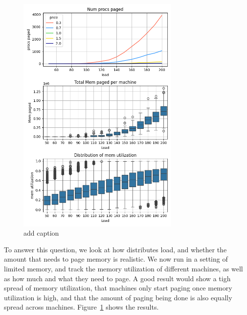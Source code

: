 \begin{figure}[t!]
    \centering
      \includegraphics[width=8cm]{img/memory_graphs.png}
      \caption{ add caption }
    \label{fig:memory-graphs}
\end{figure}

To answer this question, we look at how \sys{} distributes load, and whether the
amount that \sys{} needs to page memory is realistic. We now run \sys{} in a
setting of limited memory, and track the memory utilization of different
machines, as well as how much and what they need to page. A good result would
show a tigh spread of memory utilization, that machines only start paging once
memory utilization is high, and that the amount of paging being done is also
equally spread across machines. Figure~\ref{fig:memory-graphs} shows the
results.


